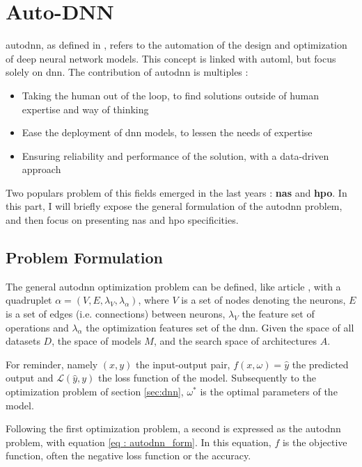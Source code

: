 \section{Auto-DNN}
\label{sec:autodnn}
\acrfull{autodnn}, as defined in \cite{talbi_automated_2021}, refers to the automation of the design and optimization of deep neural network models. This concept is linked with \acrfull{automl}, but focus solely on \acrshort{dnn}. The contribution of \acrshort{autodnn} is multiples : 
\begin{itemize}
    \item Taking the human out of the loop, to find solutions outside of human expertise and way of thinking
    \item Ease the deployment of \acrshort{dnn} models, to lessen the needs of expertise
    \item Ensuring reliability and performance of the solution, with a data-driven approach
\end{itemize}

Two populars problem of this fields emerged in the last years : \textbf{\acrfull{nas}} and \textbf{\acrfull{hpo}}. In this part, I will briefly expose the general formulation of the \acrshort{autodnn} problem, and then focus on presenting \acrshort{nas} and \acrshort{hpo} specificities. 


\subsection{Problem Formulation}
\label{sec : autodnn_pbm}
The general \acrshort{autodnn} optimization problem can be defined, like article \cite{talbi_automated_2021}, with a quadruplet $\alpha = (V,E,\lambda_V, \lambda_\alpha)$, where $V$ is a set of nodes denoting the neurons, $E$ is a set of edges (i.e. connections) between neurons, $\lambda_V$ the feature set of operations and $\lambda_\alpha$ the optimization features set of the \acrshort{dnn}. Given the space of all datasets $D$, the space of models $M$, and the search space of architectures $A$.

For reminder, namely $(x,y)$ the input-output pair, $f(x,\omega)=\hat{y}$ the predicted output and $\mathcal{L}(\hat{y},y)$ the loss function of the model. Subsequently to the optimization problem of section \ref{sec:dnn}, $\omega^*$ is the optimal parameters of the model.

Following the first optimization problem, a second is expressed as the \acrshort{autodnn} problem, with equation \ref{eq : autodnn_form}. In this equation, $f$ is the objective function, often the negative loss function or the accuracy. 

